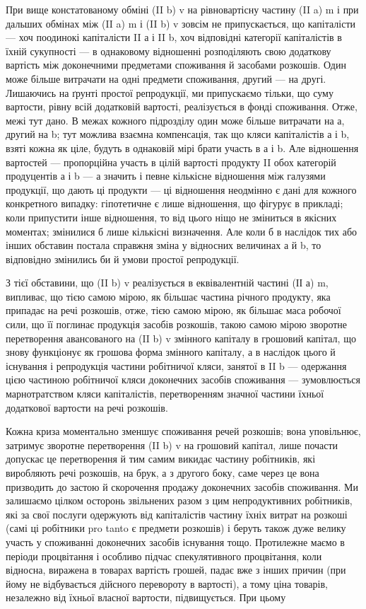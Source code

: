 При вище констатованому обміні (II b) v на рівновартісну частину
(II a) m і при дальших обмінах між (II a) m і (II b) v зовсім не припускається,
що капіталісти — хоч поодинокі капіталісти II а і II b, хоч відповідні
категорії капіталістів в їхній сукупності — в однаковому відношенні
розподіляють свою додаткову вартість між доконечними предметами споживання
й засобами розкошів. Один може більше витрачати на одні
предмети споживання, другий — на другі. Лишаючись на ґрунті простої
репродукції, ми припускаємо тільки, що суму вартости, рівну всій додатковій
вартості, реалізується в фонді споживання. Отже, межі тут
дано. В межах кожного підрозділу один може більше витрачати на а,
другий на b; тут можлива взаємна компенсація, так що кляси капіталістів
а і b, взяті кожна як ціле, будуть в однаковій мірі брати участь
в а і b. Але відношення вартостей — пропорційна участь в цілій вартості
продукту II обох категорій продуцентів а і b — а значить і певне кількісне
відношення між галузями продукції, що дають ці продукти — ці
відношення неодмінно є дані для кожного конкретного випадку: гіпотетичне
є лише відношення, що фігурує в прикладі; коли припустити
інше відношення, то від цього ніщо не зміниться в якісних моментах;
змінилися б лише кількісні визначення. Але коли б в наслідок тих або
інших обставин постала справжня зміна у відносних величинах а й b, то
відповідно змінились би й умови простої репродукції.

З тієї обставини, що (II b) v реалізується в еквівалентній частині
(ІІ а) m, випливає, що тією самою мірою, як більшає частина річного
продукту, яка припадає на речі розкошів, отже, тією самою мірою, як
більшає маса робочої сили, що її поглинає продукція засобів розкошів,
такою самою мірою зворотне перетворення авансованого на (II b) v
змінного капіталу в грошовий капітал, що знову функціонує як грошова
форма змінного капіталу, а в наслідок цього й існування і репродукція
частини робітничої кляси, занятої в II b — одержання цією частиною робітничої
кляси доконечних засобів споживання — зумовлюється марнотратством
кляси капіталістів, перетворенням значної частини їхньої додаткової
вартости на речі розкошів.

Кожна криза моментально зменшує споживання речей розкошів; вона
уповільнює, затримує зворотне перетворення (II b) v на грошовий капітал,
лише почасти допускає це перетворення й тим самим викидає частину робітників,
які виробляють речі розкошів, на брук, а з другого боку, саме через
це вона призводить до застою й скорочення продажу доконечних засобів
споживання. Ми залишаємо цілком осторонь звільнених разом з цим
непродуктивних робітників, які за свої послуги одержують від капіталістів
частину їхніх витрат на розкоші (самі ці робітники pro tanto є
предмети розкошів) і беруть також дуже велику участь у споживанні
доконечних засобів існування тощо. Протилежне маємо в періоди процвітання
і особливо підчас спекулятивного процвітання, коли відносна,
виражена в товарах вартість грошей, падає вже з інших причин (при
йому не відбувається дійсного перевороту в вартості), а тому ціна товарів,
незалежно від їхньої власної вартости, підвищується. При цьому
\parbreak{}  %
